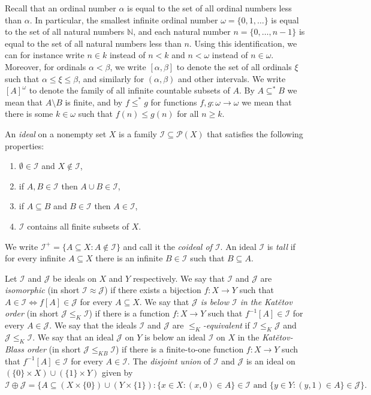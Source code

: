 \documentclass{amsart}
\theoremstyle{plain}
\theoremstyle{definition}
\theoremstyle{remark}
\newcommand{\bN}{\mathbb{N}}
\newcommand{\N}{\bN}
\newcommand{\cI}{\mathcal{I}}
\newcommand{\I}{\cI}
\newcommand{\cJ}{\mathcal{J}}
\newcommand{\J}{\cJ}
\newcommand{\cP}{\mathcal{P}}
\renewcommand{\subset}{\subseteq}
\begin{document}
Recall that an ordinal number $\alpha$ is equal to the set of all ordinal numbers less than $\alpha$. 
In particular, the  smallest infinite ordinal number $\omega=\{0,1,\dots\}$ is equal to the set of all natural numbers $\N$, and each natural number $n = \{0,\dots,n-1\}$ is equal  to the set of all natural numbers less than $n$.
Using this identification, we can for instance write $n\in k$ instead of $n<k$ and $n<\omega$ instead of $n\in \omega$. 
Moreover, for ordinals $\alpha<\beta$, we write 
$[\alpha,\beta]$ to denote the set of all ordinals $\xi$ such that  $\alpha\leq \xi\leq \beta$, and similarly for $(\alpha,\beta)$ and other intervals.
 We write  $[A]^\omega$ to denote the family of all infinite countable subsets of $A$.
 By $A\subseteq^* B$ we mean that $A\setminus B$ is finite, and by $f\leq^* g$ for functions $f,g:\omega\to\omega$ we mean that there is some $k\in\omega $ such that $f(n)\leq g(n)$ for all $n\geq k$.

An \emph{ideal} on a nonempty set $X$ is a  family $\I\subseteq\cP(X)$ that satisfies the following properties:
\begin{enumerate}
\item $\emptyset\in \I$ and $X\not\in\I$,
\item if $A,B\in \I$ then $A\cup B\in\I$,
\item if $A\subseteq B$ and $B\in\I$ then $A\in\I$,
\item $\I$ contains all finite subsets of $X$. 
\end{enumerate}
We write $\I^+=\{A\subseteq X: A\notin\I\}$ and call it the \emph{coideal of $\I$}.
An ideal $\I$ is \emph{tall}  if for every infinite $A\subseteq X$ there is an infinite $B\in\I$ such that $B\subseteq A$. 


 Let $\I$ and $\J$ be ideals on $X$ and $Y$ respectively.
We say that $\I$ and $\J$ are \emph{isomorphic} (in short $\I\approx\J$) 
if there exists a bijection $f:X\rightarrow Y$ such that $A\in\I\iff f[A]\in\J$ for every $A\subset X$.
We say that \emph{$\J$ is below $\I$ in  the Kat\v{e}tov order} (in short $\J\leq_{K}\I$) if there is a function $f:X\rightarrow Y$ such that $f^{-1}[A]\in\I$ for every $A\in \J$. 
We say that the ideals $\I$ and $\J$ are \emph{$\leq_K$-equivalent} if $\I\leq_K\J$ and $\J\leq_K\I$. 
We say that an ideal $\J$ on $Y$  is below an ideal $\I$ on $X$  in  the \emph{Kat\v{e}tov-Blass order} (in short $\J\leq_{KB}\I$) if there is a finite-to-one function $f:X\to Y$ such that $f^{-1}[A]\in\I$ for every $A\in \I$. 
The \emph{disjoint union} of $\I$ and $\J$ is an ideal on $(\{0\}\times X)\cup(\{1\}\times Y)$ given by
$\I \oplus \J =\{A\subset (X\times\{0\})\cup(Y\times \{1\}): \{x\in X: (x,0)\in A\}  \in \I \text{ and } \{y\in Y: (y,1)\in A\} \in \J\}.$
\end{document}
